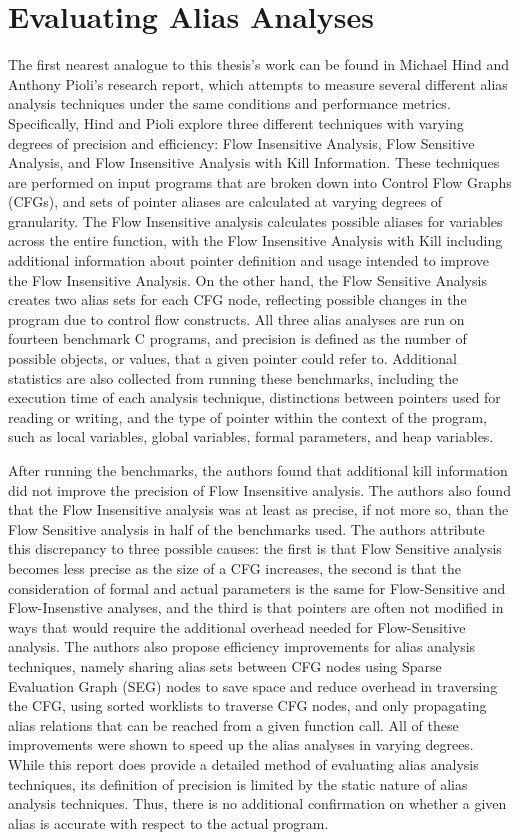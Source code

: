 \section{Evaluating Alias Analyses}
The first nearest analogue to this thesis's work can be found in Michael Hind and Anthony Pioli's research report, which attempts to measure several different alias analysis techniques under the same conditions and performance metrics. Specifically, Hind and Pioli explore three different techniques with varying degrees of precision and efficiency: Flow Insensitive Analysis, Flow Sensitive Analysis, and Flow Insensitive Analysis with Kill Information. These techniques are performed on input programs that are broken down into Control Flow Graphs (CFGs), and sets of pointer aliases are calculated at varying degrees of granularity. The Flow Insensitive analysis calculates possible aliases for variables across the entire function, with the Flow Insensitive Analysis with Kill including additional information about pointer definition and usage intended to improve the Flow Insensitive Analysis. On the other hand, the Flow Sensitive Analysis creates two alias sets for each CFG node, reflecting possible changes in the program due to control flow constructs. All three alias analyses are run on fourteen benchmark C programs, and precision is defined as the number of possible objects, or values, that a given pointer could refer to. Additional statistics are also collected from running these benchmarks, including the execution time of each analysis technique, distinctions between pointers used for reading or writing, and the type of pointer within the context of the program, such as local variables, global variables, formal parameters, and heap variables.

After running the benchmarks, the authors found that additional kill information did not improve the precision of Flow Insensitive analysis. The authors also found that the Flow Insensitive analysis was at least as precise, if not more so, than the Flow Sensitive analysis in half of the benchmarks used. The authors attribute this discrepancy to three possible causes: the first is that Flow Sensitive analysis becomes less precise as the size of a CFG increases, the second is that the consideration of formal and actual parameters is the same for Flow-Sensitive and Flow-Insenstive analyses, and the third is that pointers are often not modified in ways that would require the additional overhead needed for Flow-Sensitive analysis. The authors also propose efficiency improvements for alias analysis techniques, namely sharing alias sets between CFG nodes using Sparse Evaluation Graph (SEG) nodes to save space and reduce overhead in traversing the CFG, using sorted worklists to traverse CFG nodes, and only propagating alias relations that can be reached from a given function call. All of these improvements were shown to speed up the alias analyses in varying degrees. While this report does provide a detailed method of evaluating alias analysis techniques, its definition of precision is limited by the static nature of alias analysis techniques. Thus, there is no additional confirmation on whether a given alias is accurate with respect to the actual program.

